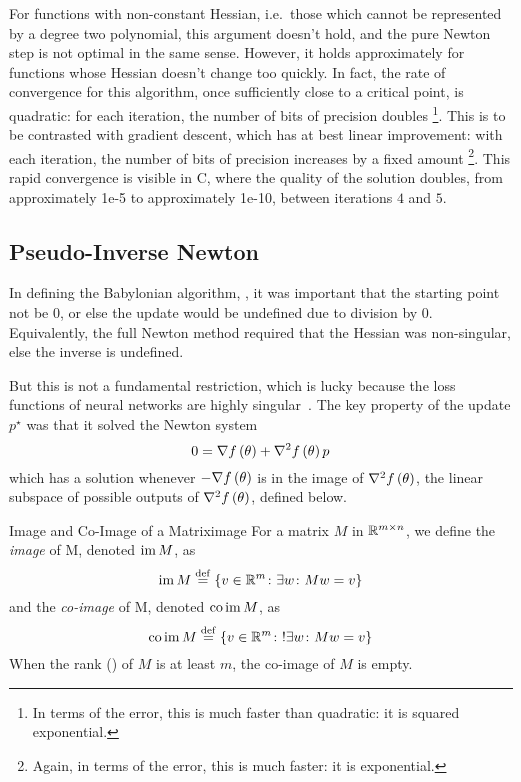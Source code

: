 \documentclass[../../thesis.tex]{subfiles}
\begin{document}
For functions with non-constant Hessian,
i.e.~those which cannot be represented by a degree two polynomial,
this argument doesn't hold,
and the pure Newton step is not optimal in the same sense.
However, it holds approximately for functions whose Hessian
doesn't change too quickly.
In fact, the rate of convergence for this algorithm,
once sufficiently close to a critical point,
is quadratic:
for each iteration, the number of bits of precision doubles%
\footnote{In terms of the error, this is much faster than quadratic:
it is squared exponential.}.
This is to be contrasted with gradient descent,
which has at best linear improvement:
with each iteration, the number of bits of precision increases by a fixed amount%
\footnote{Again, in terms of the error, this is much faster:
it is exponential.}.
This rapid convergence is visible in
C,
where the quality of the solution doubles,
from approximately 1e-5
to approximately 1e-10,
between iterations $4$ and $5$.

\subsection{Pseudo-Inverse Newton}

In defining the Babylonian algorithm,
,
it was important that the starting point not be $0$,
or else the update would be undefined due to division by $0$.
Equivalently,
the full Newton method 
required that the Hessian was non-singular,
else the inverse is undefined.

But this is not a fundamental restriction,
which is lucky because the loss functions of neural networks
are highly singular~\cite{sagun2017}.
The key property of the update $p^\star$
was that it solved the Newton system
\begin{equation}\equationlabel{newtonsystem}
	0 = \grad{f}{\theta} + \hess{f}{\theta}p
\end{equation}
\noindent which has a solution whenever $-\nabla f\left(\theta\right)$
is in the image of $\nabla^2f\left(\theta\right)$,
the linear subspace of possible outputs of $\nabla^2f\left(\theta\right)$,
defined below.

\begin{definition}{Image and Co-Image of a Matrix}{image}
	For a matrix $M$ in $\mathbb{R}^{m \times n}$,
	we define the \emph{image} of M, denoted $\operatorname*{im} M$, as
	\begin{equation}
		\operatorname*{im} M \stackrel{\small \mathrm{def}}{=} \left\{v \in \mathbb{R}^m \colon \exists w \colon Mw=v\right\}
	\end{equation}
	and the \emph{co-image} of M, denoted $\operatorname*{co}\operatorname*{im} M$, as
	\begin{equation}
		\operatorname*{co}\operatorname*{im} M \stackrel{\small \mathrm{def}}{=} \left\{v \in \mathbb{R}^m \colon !\exists w \colon Mw=v\right\}
	\end{equation}
	When the rank () of $M$ is at least $m$,
	the co-image of $M$ is empty.
\end{definition}
\end{document}
